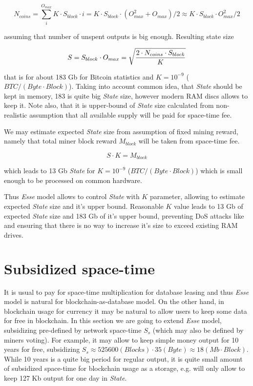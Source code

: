 \documentclass[]{article}   %
\newcommand{\esse}{\textit{Esse}}
\newcommand{\state}{\textit{State}}
\begin{document}
\begin{equation}
N_{coins} = \sum_i^{O_{max}}{K \cdot S_{block} \cdot i} = K \cdot S_{block} \cdot ( O_{max}^2 + O_{max}) / 2 \approx K \cdot S_{block} \cdot O_{max}^2 / 2
\end{equation}

assuming that number of unspent outputs is big enough. Resulting state size

\begin{equation}
\label{eq:statesizemax}
S = S_{block} \cdot O_{max} = \sqrt { 2 \cdot N_{coins} \cdot S_{block} \over K}
\end{equation}

that is for about 183 Gb for Bitcoin statistics and $K=10^{-9}$ ($BTC / (Byte \cdot Block)$). Taking into account common idea, that \state{} should be kept in memory, 183 is quite big \state{} size, however modern RAM discs allows to keep it. Note also, that it is upper-bound of \state{} size calculated from non-realistic assumption that all available supply will be paid for space-time fee.

We may estimate expected \state{} size from assumption of fixed mining reward, namely that total miner block reward $M_{block}$ will be taken from space-time fee.

\begin{equation}
\label{eq:statesizeexp}
S \cdot K = M_{block}
\end{equation}

which leads to 13 Gb \state{} for $K=10^{-9}$ ($BTC / (Byte \cdot Block)$) which is small enough to be processed on common hardware.

Thus \esse{} model allows to control \state{} with $K$ parameter, allowing to estimate expected \state{} size and it's upper bound. Reasonable $K$ value leads to 13 Gb of expected \state{} size and 183 Gb of it's upper bound, preventing DoS attacks like \cite{bitcoin2015flood} and ensuring that there is no way to increase it's size to exceed existing RAM drives.

\section{Subsidized space-time}

It is usual to pay for space-time multiplication for database leasing and thus \esse{} model is natural for blockchain-as-database model. On the other hand, in blockchain usage for currency it may be natural to allow users to keep some data for free in blockchain. In this section we are going to extend \esse{} model, subsidizing pre-defined by network space-time $S_s$ (which may also be defined by miners voting). For example, it may allow to keep simple money output for 10 years for free, subsidizing $S_s \approx 525600 (Blocks) \cdot 35 (Byte) \approx 18 (Mb \cdot Block)$. While 10 years is a quite big period for regular output, it is quite small amount of subsidized space-time for blockchain usage as a storage, e.g. will only allow to keep 127 Kb output for one day in \state{}.
\end{document}
